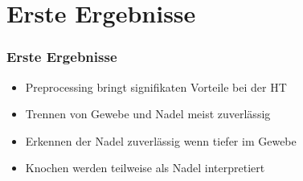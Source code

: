 \documentclass[11pt]{beamer}
\begin{document}
\section{Erste Ergebnisse}
\begin{frame}
\frametitle{Erste Ergebnisse}
\begin{itemize}
\item Preprocessing bringt signifikaten Vorteile bei der HT
\item Trennen von Gewebe und Nadel meist zuverlässig
\item Erkennen der Nadel zuverlässig wenn tiefer im Gewebe
\item Knochen werden teilweise als Nadel interpretiert
\end{itemize}
\end{frame}

\end{document}
